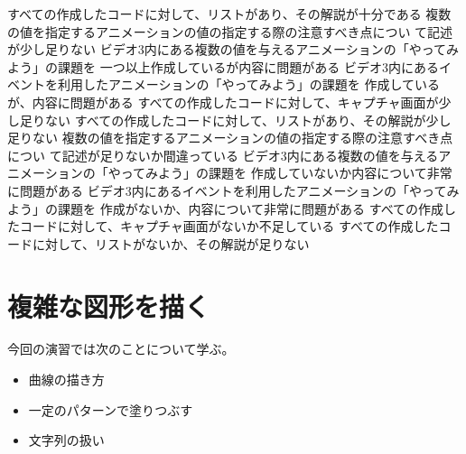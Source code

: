 \documentclass[a4j]{jreport}
\begin{document}
{{	{すべての作成したコードに対して、リストがあり、その解説が十分である}
  }
	{
	{複数の値を指定するアニメーションの値の指定する際の注意すべき点につい
	て記述が少し足りない}
	{ビデオ3内にある複数の値を与えるアニメーションの「やってみよう」の課題を
一つ以上作成しているが内容に問題がある}
	{ビデオ3内にあるイベントを利用したアニメーションの「やってみよう」の課題を
作成しているが、内容に問題がある}
	{すべての作成したコードに対して、キャプチャ画面が少し足りない}
	{すべての作成したコードに対して、リストがあり、その解説が少し足りない}
  }
	{
	{複数の値を指定するアニメーションの値の指定する際の注意すべき点につい
	て記述が足りないか間違っている}
	{ビデオ3内にある複数の値を与えるアニメーションの「やってみよう」の課題を
作成していないか内容について非常に問題がある}
	{ビデオ3内にあるイベントを利用したアニメーションの「やってみよう」の課題を
作成がないか、内容について非常に問題がある}
	{すべての作成したコードに対して、キャプチャ画面がないか不足している}
	{すべての作成したコードに対して、リストがないか、その解説が足りない}
	}
 	}
\chapter{複雑な図形を描く}
今回の演習では次のことについて学ぶ。
\begin{itemize}
 \item 曲線の描き方
 \item 一定のパターンで塗りつぶす
 \item 文字列の扱い
\end{itemize}
\end{document}

